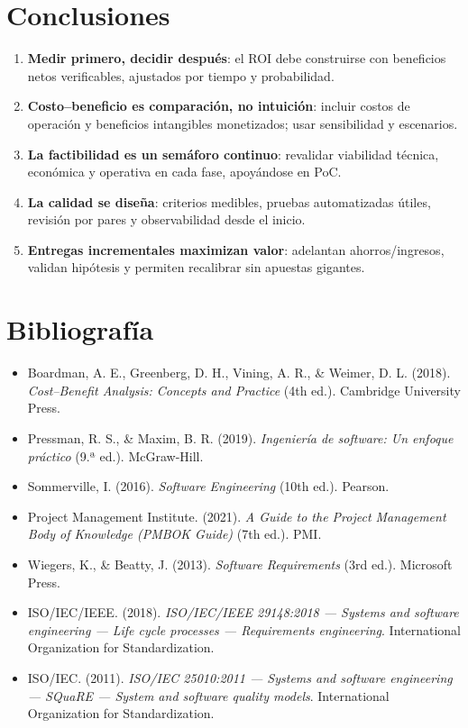 \documentclass[12pt]{article}
\begin{document}
\section{Conclusiones}
\begin{enumerate}[leftmargin=2em]
  \item \textbf{Medir primero, decidir después}: el ROI debe construirse con beneficios netos verificables, ajustados por tiempo y probabilidad.
  \item \textbf{Costo–beneficio es comparación, no intuición}: incluir costos de operación y beneficios intangibles monetizados; usar sensibilidad y escenarios.
  \item \textbf{La factibilidad es un semáforo continuo}: revalidar viabilidad técnica, económica y operativa en cada fase, apoyándose en PoC.
  \item \textbf{La calidad se diseña}: criterios medibles, pruebas automatizadas útiles, revisión por pares y observabilidad desde el inicio.
  \item \textbf{Entregas incrementales maximizan valor}: adelantan ahorros/ingresos, validan hipótesis y permiten recalibrar sin apuestas gigantes.
\end{enumerate}

\section{Bibliografía}
\begin{itemize}[leftmargin=2em]
  \item Boardman, A. E., Greenberg, D. H., Vining, A. R., \& Weimer, D. L. (2018). \textit{Cost–Benefit Analysis: Concepts and Practice} (4th ed.). Cambridge University Press.
  \item Pressman, R. S., \& Maxim, B. R. (2019). \textit{Ingeniería de software: Un enfoque práctico} (9.ª ed.). McGraw-Hill.
  \item Sommerville, I. (2016). \textit{Software Engineering} (10th ed.). Pearson.
  \item Project Management Institute. (2021). \textit{A Guide to the Project Management Body of Knowledge (PMBOK\textsuperscript{\textregistered} Guide)} (7th ed.). PMI.
  \item Wiegers, K., \& Beatty, J. (2013). \textit{Software Requirements} (3rd ed.). Microsoft Press.
  \item ISO/IEC/IEEE. (2018). \textit{ISO/IEC/IEEE 29148:2018 — Systems and software engineering — Life cycle processes — Requirements engineering}. International Organization for Standardization.
  \item ISO/IEC. (2011). \textit{ISO/IEC 25010:2011 — Systems and software engineering — SQuaRE — System and software quality models}. International Organization for Standardization.
\end{itemize}
\end{document}
